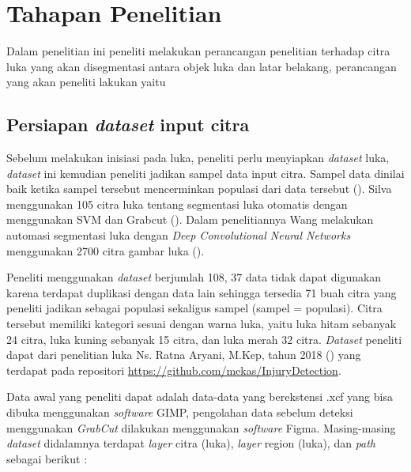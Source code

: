 \section{Tahapan Penelitian} \label{section:tahapan_penelitian}
Dalam penelitian ini peneliti melakukan perancangan penelitian terhadap citra luka 
yang akan disegmentasi antara objek luka dan latar belakang, perancangan yang akan
peneliti lakukan yaitu 

\subsection{Persiapan \emph{dataset} input citra}

Sebelum melakukan inisiasi pada luka, peneliti perlu menyiapkan \emph{dataset} luka, \emph{dataset}
ini kemudian peneliti jadikan sampel data input citra. Sampel data dinilai baik 
ketika sampel tersebut mencerminkan populasi dari data tersebut (\cite{Rizki:2022}). 
Silva menggunakan 105 citra luka tentang segmentasi luka otomatis dengan menggunakan 
SVM dan Grabcut (\cite{Silva:2015}). Dalam penelitiannya Wang melakukan automasi segmentasi luka dengan
\emph{Deep Convolutional Neural Networks} menggunakan 2700 citra gambar luka (\cite{Wang:2015}).

Peneliti menggunakan \emph{dataset} berjumlah 108, 37 data tidak dapat digunakan 
karena terdapat duplikasi dengan data lain sehingga tersedia 71 buah citra 
yang peneliti jadikan sebagai populasi sekaligus sampel (sampel = populasi).
Citra tersebut memiliki kategori sesuai dengan warna luka, yaitu luka hitam sebanyak
24 citra, luka kuning sebanyak 15 citra, dan luka merah 32 citra. \emph{Dataset}
peneliti dapat dari penelitian luka Ns. Ratna Aryani, M.Kep, tahun 2018 (\cite{Aryani:2018})
yang terdapat pada repositori \url{https://github.com/mekas/InjuryDetection}.

Data awal yang peneliti dapat adalah data-data yang berekstensi .xcf yang bisa 
dibuka menggunakan \emph{software} GIMP, pengolahan data sebelum deteksi menggunakan
\emph{GrabCut} dilakukan menggunakan \emph{software} Figma. Masing-masing \emph{dataset} 
didalamnya terdapat \emph{layer} citra (luka), \emph{layer} region (luka), dan 
\emph{path} sebagai berikut :

